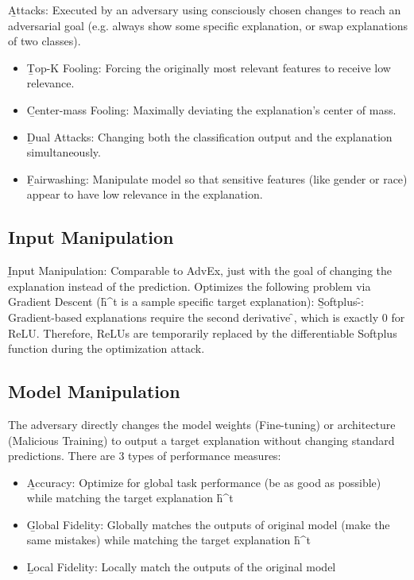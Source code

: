 \b{Attacks}: Executed by an adversary using consciously chosen changes to reach an adversarial goal (e.g. always show some specific explanation, or swap explanations of two classes).
\begin{itemize}
\item \b{Top-K Fooling}: Forcing the originally most relevant features to receive low relevance.
\item \b{Center-mass Fooling}: Maximally deviating the explanation's center of mass.
\item \b{Dual Attacks}: Changing both the classification output and the explanation simultaneously.
\item \b{Fairwashing}: Manipulate model so that sensitive features (like gender or race) appear to have low relevance in the explanation.
\end{itemize}



\subsection{Input Manipulation}
\b{Input Manipulation}: Comparable to AdvEx, just with the goal of changing the explanation instead of the prediction. Optimizes the following problem via Gradient Descent (\f{h^t} is a sample specific target explanation):
\b{Softplus-\f{\boldsymbol{\beta}}}: Gradient-based explanations require the second derivative \f{}, which is exactly 0 for ReLU. Therefore, ReLUs are temporarily replaced by the differentiable Softplus function during the optimization attack.


\subsection{Model Manipulation}
The adversary directly changes the model weights (Fine-tuning) or architecture (Malicious Training) to output a target explanation without changing standard predictions. There are 3 types of performance measures:
\begin{itemize}
    \item \b{Accuracy}: Optimize for global task performance (be as good as possible) while matching the target explanation \f{h^t}
    \item \b{Global Fidelity}: Globally matches the outputs of original model (make the same mistakes) while matching the target explanation \f{h^t}
    \item \b{Local Fidelity}: Locally match the outputs of the original model
\end{itemize}


